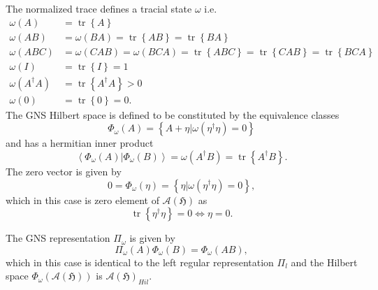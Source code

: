 \documentclass[aps,preprint]{revtex4}%
\begin{document}
The normalized trace defines a tracial state $\omega$ i.e.
\begin{align}
\omega\left(  A\right)   &  =\operatorname*{tr}\left\{  A\right\} \\
\omega\left(  AB\right)   &  =\omega\left(  BA\right)  =\operatorname*{tr}%
\left\{  AB\right\}  =\operatorname*{tr}\left\{  BA\right\} \\
\omega\left(  ABC\right)   &  =\omega\left(  CAB\right)  =\omega\left(
BCA\right)  =\operatorname*{tr}\left\{  ABC\right\}  =\operatorname*{tr}%
\left\{  CAB\right\}  =\operatorname*{tr}\left\{  BCA\right\} \\
\omega\left(  I\right)   &  =\operatorname*{tr}\left\{  I\right\}  =1\\
\omega\left(  A^{\dagger}A\right)   &  =\operatorname*{tr}\left\{  A^{\dagger
}A\right\}  >0\\
\omega\left(  0\right)   &  =\operatorname*{tr}\left\{  0\right\}  =0.
\end{align}
The GNS Hilbert space is defined to be constituted by the equivalence classes
\begin{equation}
\Phi_{\omega}\left(  A\right)  =\left\{  \left.  A+\eta\right\vert
\omega\left(  \eta^{\dagger}\eta\right)  =0\right\}
\end{equation}
and has a hermitian inner product
\begin{equation}
\left\langle \left.  \Phi_{\omega}\left(  A\right)  \right\vert \Phi_{\omega
}\left(  B\right)  \right\rangle =\omega\left(  A^{\dagger}B\right)
=\operatorname*{tr}\left\{  A^{\dagger}B\right\}  .
\end{equation}
The zero vector is given by
\begin{equation}
0=\Phi_{\omega}\left(  \eta\right)  =\left\{  \left.  \eta\right\vert
\omega\left(  \eta^{\dagger}\eta\right)  =0\right\}  ,
\end{equation}
which in this case is zero element of $\mathcal{A}\left(  \mathfrak{H}\right)
$ as
\begin{equation}
\operatorname*{tr}\left\{  \eta^{\dagger}\eta\right\}  =0\Leftrightarrow
\eta=0.
\end{equation}


The GNS representation $\Pi_{\omega}$ is given by
\begin{equation}
\Pi_{\omega}\left(  A\right)  \Phi_{\omega}\left(  B\right)  =\Phi_{\omega
}\left(  AB\right)  ,
\end{equation}
which in this case is identical to the left regular representation $\Pi_{l}$
and the Hilbert space $\Phi_{\omega}\left(  \mathcal{A}\left(  \mathfrak{H}%
\right)  \right)  $ is $\mathcal{A}\left(  \mathfrak{H}\right)  _{Hil}.$
\end{document}
